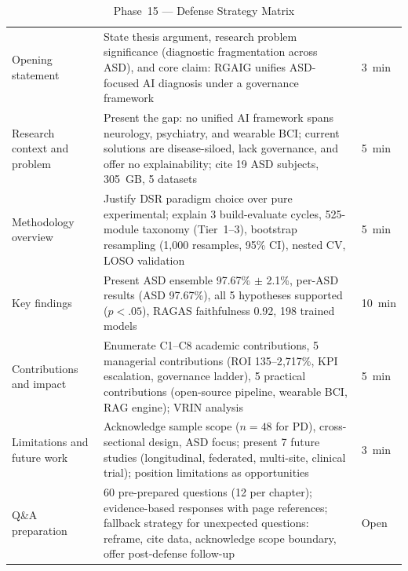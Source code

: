 \begingroup\singlespacing\tablefontsize\tablestripes
\begin{xltabular}{\textwidth}{@{} l X l @{}}
\caption{Phase~15 --- Defense Strategy Matrix}
\label{tab:phase15_defense}\\
\toprule
{} &  &  \\
\midrule
\endfirsthead
\endhead
\bottomrule
\endlastfoot
Opening statement          & State thesis argument, research problem significance (diagnostic fragmentation across ASD), and core claim: RGAIG unifies ASD-focused AI diagnosis under a governance framework                              & 3~min \\
\addlinespace
Research context and problem & Present the gap: no unified AI framework spans neurology, psychiatry, and wearable BCI; current solutions are disease-siloed, lack governance, and offer no explainability; cite 19 ASD subjects, 305~GB, 5 datasets          & 5~min \\
\addlinespace
Methodology overview       & Justify DSR paradigm choice over pure experimental; explain 3 build-evaluate cycles, 525-module taxonomy (Tier~1--3), bootstrap resampling (1,000 resamples, 95\% CI), nested CV, LOSO validation                            & 5~min \\
\addlinespace
Key findings               & Present ASD ensemble 97.67\% $\pm$ 2.1\%, per-ASD results (ASD 97.67\%), all 5 hypotheses supported ($p < .05$), RAGAS faithfulness 0.92, 198 trained models            & 10~min \\
\addlinespace
Contributions and impact   & Enumerate C1--C8 academic contributions, 5 managerial contributions (ROI 135--2{,}717\%, KPI escalation, governance ladder), 5 practical contributions (open-source pipeline, wearable BCI, RAG engine); VRIN analysis                 & 5~min \\
\addlinespace
Limitations and future work & Acknowledge sample scope ($n = 48$ for PD), cross-sectional design, ASD focus; present 7 future studies (longitudinal, federated, multi-site, clinical trial); position limitations as opportunities                    & 3~min \\
\addlinespace
Q\&A preparation           & 60 pre-prepared questions (12 per chapter); evidence-based responses with page references; fallback strategy for unexpected questions: reframe, cite data, acknowledge scope boundary, offer post-defense follow-up           & Open \\
\end{xltabular}
\endgroup


